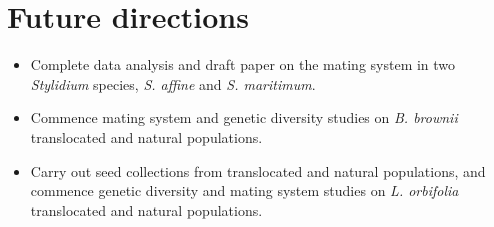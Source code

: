 \documentclass[version=last,
    paper=a4, %
    10pt, %
    usenames,
    dvipsnames,
    oneside, %
    headings=openany, %
    DIV=15 %
]{scrbook}
\begin{document}
\section*{Future directions}
\begin{itemize}
\itemsep1pt\parskip0pt
\item
  Complete data analysis and draft paper on the mating system in two
  \emph{Stylidium} species, \emph{S. affine} and \emph{S. maritimum}.
\item
  Commence mating system and genetic diversity studies on \emph{B.
  brownii} translocated and natural populations.
\item
  Carry out seed collections from translocated and natural populations,
  and commence genetic diversity and mating system studies on \emph{L.
  orbifolia} translocated and natural populations.
\end{itemize}



\end{document}
